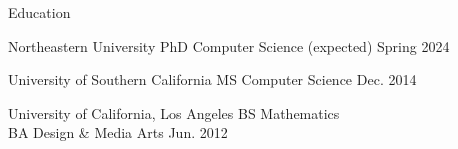 \documentclass[]{cv}
\begin{document}
\resumeheader
{}
{}
{}
{}

\begin{section}{Education}
    \begin{subsectionnobullet}
        {Northeastern University}
        {PhD Computer Science}
        {(expected) Spring 2024}
    \end{subsectionnobullet}
    
    \begin{subsectionnobullet}
        {University of Southern California}
        {MS Computer Science}
        {Dec. 2014}
    \end{subsectionnobullet}

    \begin{subsectionnobullet}
        {University of California, Los Angeles}
        {BS Mathematics\\ BA Design \& Media Arts}
        {Jun. 2012}
    \end{subsectionnobullet}
\end{section}
\end{document}
